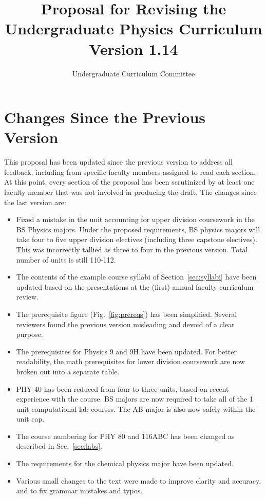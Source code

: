 \documentclass[12pt]{article}
\begin{document}

\title{Proposal for Revising the \\ Undergraduate Physics Curriculum \\ Version 1.14}
\author{Undergraduate Curriculum Committee}

\maketitle

\section{Changes Since the Previous Version}

This proposal has been updated since the previous version to address
all feedback, including from specific faculty members assigned to read
each section.  At this point, every section of the proposal has been
scrutinized by at least one faculty member that was not involved in
producing the draft.  The changes since the last version are:
\begin{itemize}
 \item Fixed a mistake in the unit accounting for upper division
   coursework in the BS Physics majors.  Under the proposed
   requirements, BS physics majors will take four to five upper
   division electives (including three capstone electives).  This was
   incorrectly tallied as three to four in the previous version.
   Total number of units is still 110-112.
 \item The contents of the example course syllabi of
   Section~\ref{sec:syllabi} have been updated based on the
   presentations at the (first) annual faculty curriculum review.
 \item The prerequisite figure (Fig.~\ref{fig:prereqs}) has been
   simplified.  Several reviewers found the previous version
   misleading and devoid of a clear purpose.   
 \item The prerequisites for Physics 9 and 9H have been updated.  For
   better readability, the math prerequisites for lower division coursework are
   now broken out into a separate table.
 \item PHY 40 has been reduced from four to three units, based on recent experience with the course.  BS majors are now required to take all of the 1 unit computational lab courses.  The AB major is also now safely within the unit cap. 
 \item The course numbering for PHY 80 and 116ABC has been changed as described in Sec.~\ref{sec:labs}.
    \item The requirements for the chemical physics major have been
   updated.      
 \item Various small changes to the text were made to improve clarity
   and accuracy, and to fix grammar mistakes and typos.
\end{itemize}
\end{document}
